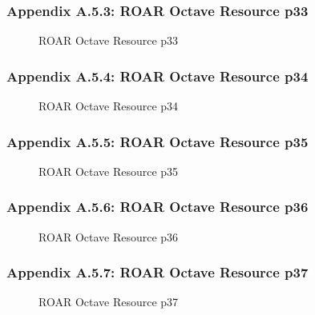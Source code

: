 \documentclass{article}[11pt]
\begin{document}
\subsubsection{Appendix A.5.3: ROAR Octave Resource p33}
\begin{figure}[h]
\begin{center}
\end{center}
\caption{ROAR Octave Resource p33}
\label{fig:roar-octave-resource-p33}
\end{figure}
\newline
\subsubsection{Appendix A.5.4: ROAR Octave Resource p34}
\begin{figure}[h]
\begin{center}
\end{center}
\caption{ROAR Octave Resource p34}
\label{fig:roar-octave-resource-p34}
\end{figure}
\newline
\subsubsection{Appendix A.5.5: ROAR Octave Resource p35}
\begin{figure}[h]
\begin{center}
\end{center}
\caption{ROAR Octave Resource p35}
\label{fig:roar-octave-resource-p35}
\end{figure}
\newline
\subsubsection{Appendix A.5.6: ROAR Octave Resource p36}
\begin{figure}[h]
\begin{center}
\end{center}
\caption{ROAR Octave Resource p36}
\label{fig:roar-octave-resource-p36}
\end{figure}
\newline
\subsubsection{Appendix A.5.7: ROAR Octave Resource p37}
\begin{figure}[h]
\begin{center}
\end{center}
\caption{ROAR Octave Resource p37}
\label{fig:roar-octave-resource-p37}
\end{figure}
\newline
\end{document}
